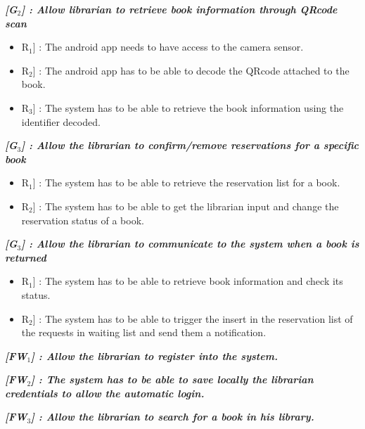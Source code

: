 \vspace{0.5cm}
\noindent
\emph{\textbf{[G$_{2}$] : Allow librarian to retrieve book information through QRcode scan}}
\begin{itemize}
	\setlength{\leftskip}{0.5cm}
	\item \lbrack R$_{1}$] : The android app needs to have access to the camera sensor.
	\item \lbrack R$_{2}$] : The android app has to be able to decode the QRcode attached to the book.
	\item \lbrack R$_{3}$] : The system has to be able to retrieve the book information using the identifier decoded.
\end{itemize}

\vspace{0.5cm}
\noindent
\emph{\textbf{[G$_{3}$] : Allow the librarian to confirm/remove reservations for a specific book}}
\begin{itemize}
	\setlength{\leftskip}{0.5cm}
	\item \lbrack R$_{1}$] : The system has to be able to retrieve the reservation list for a book.
	\item \lbrack R$_{2}$] : The system has to be able to get the librarian input and change the reservation status of a book.
\end{itemize}

\vspace{0.5cm}
\noindent
\emph{\textbf{[G$_{3}$] : Allow the librarian to communicate to the system when a book is returned}}
\begin{itemize}
	\setlength{\leftskip}{0.5cm}
	\item \lbrack R$_{1}$] : The system has to be able to retrieve book information and check its status.
	\item \lbrack R$_{2}$] : The system has to be able to trigger the insert in the reservation list of the requests in waiting list and send them a notification.
\end{itemize}

\vspace{0.5cm}
\noindent
\emph{\textbf{[FW$_{1}$] : Allow the librarian to register into the system.}}

\vspace{0.5cm}
\noindent
\emph{\textbf{[FW$_{2}$] : The system has to be able to save locally the librarian credentials to allow the automatic login.}}

\vspace{0.5cm}
\noindent
\emph{\textbf{[FW$_{3}$] : Allow the librarian to search for a book in his library.}}

